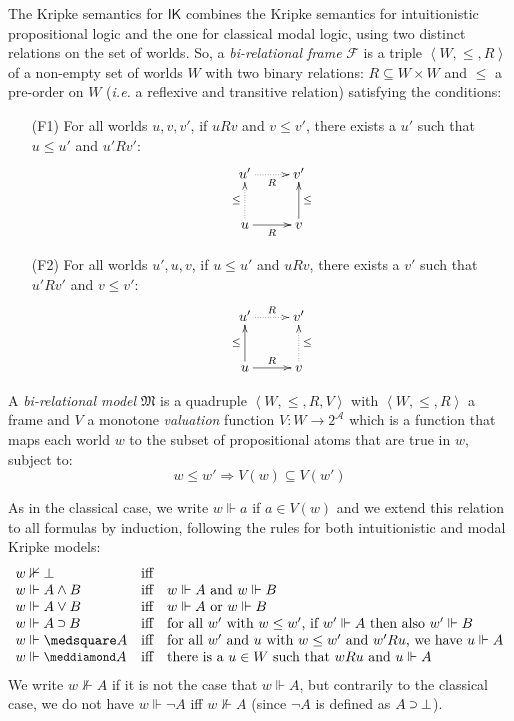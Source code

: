 \documentclass{article}
\newcommand*\mdelim[3]{%
	\mathopen{}\left#1%
	#3%
	\right#2\mathclose{}%
}
\newcommand*{\tuple}{\mdelim{\langle}{\rangle}}
\newcommand*{\NOT}{\neg}
\newcommand*{\AND}{\mathbin{\scalebox{.85}{\raise.1ex\hbox{\large$\wedge$}}}}
\newcommand*{\OR}{\mathbin{\scalebox{.85}{\raise.1ex\hbox{\large$\vee$}}}}
\newcommand*{\BOT}{\mathord{\bot}}
\newcommand*{\IMP}{\mathbin{\scalebox{.6}{\raise.4ex\hbox{\large$\bm\supset$}}}}%
\newcommand*{\BOX}{\mathord{\medsquare}}
\newcommand*{\DIA}{\mathord{\scalebox{.9}{\raise.1ex\hbox{$\meddiamond$}}}}
\newcommand*{\A}{\mathcal{A}}
\newcommand*{\F}{\mathcal{F}}
\newcommand*{\M}{\mathfrak{M}}
\newcommand{\force}[2]{#1\Vdash#2}
\newcommand{\nforce}[2]{#1\nVdash#2}
\newcommand*{\sys}[1]{\ensuremath{\mathsf{#1}}}%
\newcommand*{\IK}{\sys{IK}}
\begin{document}
The Kripke semantics for $\IK$ combines the Kripke semantics for intuitionistic propositional logic and the one for classical modal logic, using two distinct relations on the set of worlds. 
%
So, a \emph{bi-relational frame} $\F$ is a triple $\tuple{W, \le, R}$ of a non-empty set of worlds $W$ with two binary relations: $R \subseteq W \times W$ and $\le$ a pre-order on $W$ (\emph{i.e.} a reflexive and transitive relation) satisfying the conditions:
\begin{itemize}
	\item[(F1)] For all worlds $u, v, v'$, if $u R v$ and $v \le v'$, there exists a $u'$ such that $u \le u'$ and $u' R v'$:
	\begin{equation*}
	\xymatrix{
		u' \ar@{.>}[r]_R  & v' \\
		u \ar@{.>}[u]^{\le} \ar@{->}[r]_R  & v \ar@{->}[u]_{\le}
	}
	\end{equation*}
	
	\item[(F2)] For all worlds $u', u, v$, if $u \le u'$ and $u R v$, there exists a $v'$ such that $u' R v'$ and $v \le v'$:
	\begin{equation*}
	\xymatrix{
		u' \ar@{.>}[r]^R & v' \\
		u \ar@{->}[u]^{\le} \ar@{->}[r]^R & v \ar@{.>}[u]_{\le}
	}
	\end{equation*}
\end{itemize}

A \emph{bi-relational model} $\M$ is a quadruple $\tuple{W, \le, R, V}$ with $\tuple{W, \le, R}$ a frame and $V$ a monotone \emph{valuation} function $V\colon W\to2^\A$ which is a function that maps each world $w$ to the subset of propositional atoms that are true in $w$, subject to:
\begin{equation*}
w \le w' \Rightarrow V(w) \subseteq V(w')
\end{equation*}

As in the classical case, we write $\force{w}{a}$ if $a\in V(w)$ and we extend this relation to all formulas by induction, following the rules for both intuitionistic and modal Kripke models:
\begin{equation*}
\begin{array}{l@{\quad\mbox{iff}\quad}l}
\nforce w\BOT \\
\force w{A\AND B} & \mbox{$\force{w}{A}$ and $\force{w}{B}$}\\
\force w{A\OR B} & \mbox{$\force{w}{A}$ or $\force{w}{B}$}\\
\force w{A\IMP B} & \mbox{for all $w'$ with $w\le w'$, if $\force{w'}{A}$ then also $\force{w'}{B}$}\\
\force w{\BOX A} & \mbox{for all $w'$ and $u$ with $w\le w'$ and $w'Ru$, we have $\force{u}{A}$}\\
\force w{\DIA A} & \mbox{there is a $u\in W$ such that $wRu$ and $\force{u}{A}$}
\end{array}
\end{equation*}
%
We write $\nforce{w}{A}$ if it is not the case that $\force wA$, but contrarily to the classical case, we do not have $\force{w}{\neg A}$ iff $\nforce{w}{A}$ (since $\NOT A$ is defined as $A \IMP \BOT$).
\end{document}
